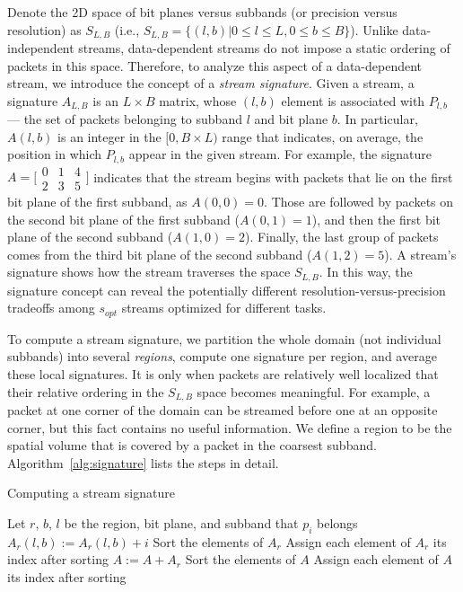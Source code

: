Denote the 2D space of bit planes versus subbands (or precision versus resolution) as $S_{L,B}$
(i.e., $S_{L,B}=\{(l,b) | 0\leq l\leq L, 0\leq b\leq B\}$). Unlike data-independent streams,
data-dependent streams do not impose a static ordering of packets in this space. Therefore, to
analyze this aspect of a data-dependent stream, we introduce the concept of a \emph{stream
signature}. Given a stream, a signature $A_{L,B}$ is an $L \times B$ matrix, whose $(l,b)$ element
is associated with $P_{l,b}$ --- the set of packets belonging to subband $l$ and bit plane $b$. In
particular, $A(l,b)$ is an integer in the $[0, B\times L)$ range that indicates, on average, the
position in which $P_{l,b}$ appear in the given stream. For example, the signature $A=\bigl[
\begin{smallmatrix}0 & 1 & 4\\ 2 & 3 & 5\end{smallmatrix}\bigr]$ indicates that the stream begins
with packets that lie on the first bit plane of the first subband, as $A(0,0)=0$. Those are followed
by packets on the second bit plane of the first subband ($A(0,1)=1$), and then the first bit plane of
the second subband ($A(1,0)=2$). Finally, the last group of packets comes from the third bit plane
of the second subband ($A(1,2)=5$). A stream's signature shows how the stream traverses the space
$S_{L,B}$. In this way, the signature concept can reveal the potentially different
resolution-versus-precision tradeoffs among $s_{opt}$ streams optimized for different tasks.

To compute a stream signature, we partition the whole domain (not individual subbands) into several
\emph{regions}, compute one signature per region, and average these local signatures. It is
only when packets are relatively well localized that their relative ordering in the $S_{L,B}$ space
becomes meaningful. For example, a packet at one corner of the domain can be streamed before one at
an opposite corner, but this fact contains no useful information. We define a region to be the
spatial volume that is covered by a packet in the coarsest subband. Algorithm~\ref{alg:signature}
lists the steps in detail.

\begin{algorithm}[h]
  \small
  \caption{Computing a stream signature}
  \begin{algorithmic}[1]
			\State Let $r$, $b$, $l$ be the region, bit plane, and subband that $p_i$ belongs
			\State $A_r(l,b) := A_r(l,b)+i$
		\EndFor
			\State Sort the elements of $A_r$
			\State Assign each element of $A_r$ its index after sorting
			\State $A := A+A_r$
		\EndFor
		\State Sort the elements of $A$
		\State Assign each element of $A$ its index after sorting
	\end{algorithmic}
	\label{alg:signature}
\end{algorithm}


